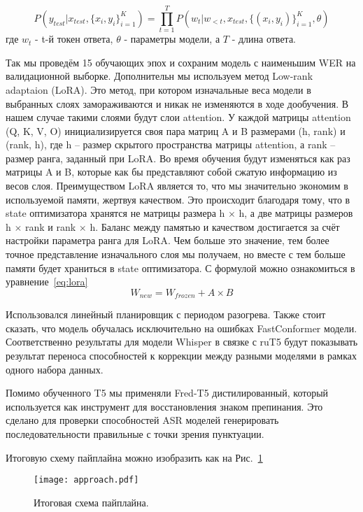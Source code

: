 \begin{equation}
  P(y_{test}|x_{test},\{x_i,y_i\}^K_{i=1}) = \prod_{t=1}^{T}P(w_t|w_{<t},x_{test},\{(x_i,y_i)\}^K_{i=1},\theta)
  \label{eq:shot}
\end{equation}
где $w_t$ - t-й токен ответа, $\theta$ - параметры модели, а $T$ - длина ответа.

Так мы проведём 15 обучающих эпох и сохраним модель с наименьшим WER на валидационной выборке.
Дополнительн мы используем метод Low-rank adaptaion (LoRA).
Это метод, при котором изначальные веса модели в выбранных слоях замораживаются и никак не изменяются в ходе дообучения.
В нашем случае такими слоями будут слои attention.
У каждой матрицы attention (Q, K, V, O) инициализируется своя пара матриц A и B размерами (h, rank) и (rank, h), где h – размер скрытого пространства матрицы attention, а rank – размер ранга, заданный при LoRA.
Во время обучения будут изменяться как раз матрицы A и B, которые как бы представляют собой сжатую информацию из весов слоя.
Преимуществом LoRA является то, что мы значительно экономим в используемой памяти, жертвуя качеством.
Это происходит благодаря тому, что в state оптимизатора хранятся не матрицы размера h $\times$ h, а две матрицы размеров h $\times$ rank и rank $\times$ h.
Баланс между памятью и качеством достигается за счёт настройки параметра ранга для LoRA.
Чем больше это значение, тем более точное представление изначального слоя мы получаем, но вместе с тем больше памяти будет храниться в state оптимизатора.
С формулой можно ознакомиться в уравнение~\ref{eq:lora}
\begin{equation}
  W_{new} = W_{frozen} + A \times B
  \label{eq:lora}
\end{equation}

Использовался линейный планировщик с периодом разогрева.
Также стоит сказать, что модель обучалась исключительно на ошибках FastConformer модели.
Соответственно результаты для модели Whisper в связке с ruT5 будут показывать результат переноса способностей к коррекции между разными моделями в рамках одного набора данных.

Помимо обученного T5 мы применяли Fred-T5 дистилированный, который используется как инструмент для восстановления знаком препинания.
Это сделано для проверки способностей ASR моделей генерировать последовательности правильные с точки зрения пунктуации.

Итоговую схему пайплайна можно изобразить как на Рис.~\ref{fig:approach}

\begin{figure}[!t]
  \centering
  \texttt{[image: approach.pdf]}
  \caption{Итоговая схема пайплайна.}
  \label{fig:approach}
\end{figure}

